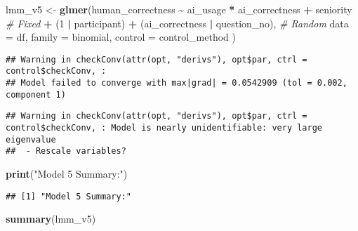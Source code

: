 \documentclass[
]{article}
\newenvironment{Shaded}{\begin{snugshade}}{\end{snugshade}}
\newcommand{\AttributeTok}[1]{\textcolor[rgb]{0.13,0.29,0.53}{#1}}
\newcommand{\CommentTok}[1]{\textcolor[rgb]{0.56,0.35,0.01}{\textit{#1}}}
\newcommand{\DecValTok}[1]{\textcolor[rgb]{0.00,0.00,0.81}{#1}}
\newcommand{\FunctionTok}[1]{\textcolor[rgb]{0.13,0.29,0.53}{\textbf{#1}}}
\newcommand{\NormalTok}[1]{#1}
\newcommand{\OtherTok}[1]{\textcolor[rgb]{0.56,0.35,0.01}{#1}}
\newcommand{\SpecialCharTok}[1]{\textcolor[rgb]{0.81,0.36,0.00}{\textbf{#1}}}
\newcommand{\StringTok}[1]{\textcolor[rgb]{0.31,0.60,0.02}{#1}}
\begin{document}
\begin{Shaded}
\begin{Highlighting}[]
\NormalTok{lmm\_v5 }\OtherTok{\textless{}{-}} \FunctionTok{glmer}\NormalTok{(human\_correctness }\SpecialCharTok{\textasciitilde{}}\NormalTok{ ai\_usage }\SpecialCharTok{*}\NormalTok{ ai\_correctness }\SpecialCharTok{+}\NormalTok{ seniority }\CommentTok{\# Fixed}
                \SpecialCharTok{+}\NormalTok{ (}\DecValTok{1} \SpecialCharTok{|}\NormalTok{ participant) }\SpecialCharTok{+}\NormalTok{ (ai\_correctness }\SpecialCharTok{|}\NormalTok{ question\_no), }\CommentTok{\# Random}
                \AttributeTok{data =}\NormalTok{ df, }\AttributeTok{family =}\NormalTok{ binomial,}
                \AttributeTok{control =}\NormalTok{ control\_method}
\NormalTok{                )}
\end{Highlighting}
\end{Shaded}

\begin{verbatim}
## Warning in checkConv(attr(opt, "derivs"), opt$par, ctrl = control$checkConv, :
## Model failed to converge with max|grad| = 0.0542909 (tol = 0.002, component 1)
\end{verbatim}

\begin{verbatim}
## Warning in checkConv(attr(opt, "derivs"), opt$par, ctrl = control$checkConv, : Model is nearly unidentifiable: very large eigenvalue
##  - Rescale variables?
\end{verbatim}

\begin{Shaded}
\begin{Highlighting}[]
\FunctionTok{print}\NormalTok{(}\StringTok{"Model 5 Summary:"}\NormalTok{)}
\end{Highlighting}
\end{Shaded}

\begin{verbatim}
## [1] "Model 5 Summary:"
\end{verbatim}

\begin{Shaded}
\begin{Highlighting}[]
\FunctionTok{summary}\NormalTok{(lmm\_v5)}
\end{Highlighting}
\end{Shaded}
\end{document}
